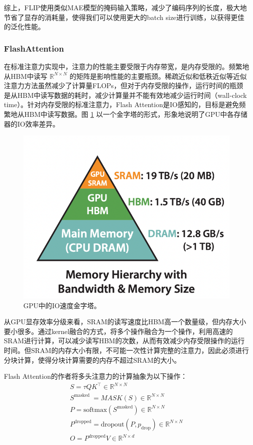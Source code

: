\documentclass[a4paper]{zreport}
\begin{document}
综上，FLIP使用类似MAE模型的掩码输入策略，减少了编码序列的长度，极大地节省了显存的消耗量，使得我们可以使用更大的batch size进行训练，以获得更佳的泛化性能。


\subsubsection{FlashAttention}

在标准注意力实现中，注意力的性能主要受限于内存带宽，是内存受限的。频繁地从HBM中读写 $\mathbb{R}^{N \times N}$ 的矩阵是影响性能的主要瓶颈。稀疏近似和低秩近似等近似注意力方法虽然减少了计算量FLOPs，但对于内存受限的操作，运行时间的瓶颈是从HBM中读写数据的耗时，减少计算量并不能有效地减少运行时间（wall-clock time）。针对内存受限的标准注意力，Flash Attention是IO感知的，目标是避免频繁地从HBM中读写数据。图 \ref{fig:flash} 以一个金字塔的形式，形象地说明了GPU中各存储器的IO效率差异。

\begin{figure}[h]
\centering
\includegraphics[width=0.5\linewidth]{figures/flash}
\caption{GPU中的IO速度金字塔。}
\label{fig:flash}
\end{figure}


从GPU显存效率分级来看，SRAM的读写速度比HBM高一个数量级，但内存大小要小很多。通过kernel融合的方式，将多个操作融合为一个操作，利用高速的SRAM进行计算，可以减少读写HBM的次数，从而有效减少内存受限操作的运行时间。但SRAM的内存大小有限，不可能一次性计算完整的注意力，因此必须进行分块计算，使得分块计算需要的内存不超过SRAM的大小。

Flash Attention的作者将多头注意力的计算抽象为以下操作：
\begin{gather}
S=\tau QK^{\top}\in\mathbb{R}^{N\times N} \\
S^\text{masked }=MASK(S)\in\mathbb{R}^{N\times N} \\
P=\mathrm{softmax}\left(S^{\mathrm{masked}}\right)\in\mathbb{R}^{N\times N} \\
P^{\mathrm{dropped}}=\mathrm{dropout} (P,p_{\mathrm{drop}} )\in\mathbb{R}^{N\times N} \\
O=P^{\mathrm{dropped}}V\in\mathbb{R}^{N\times d} 
\end{gather}
\end{document}
